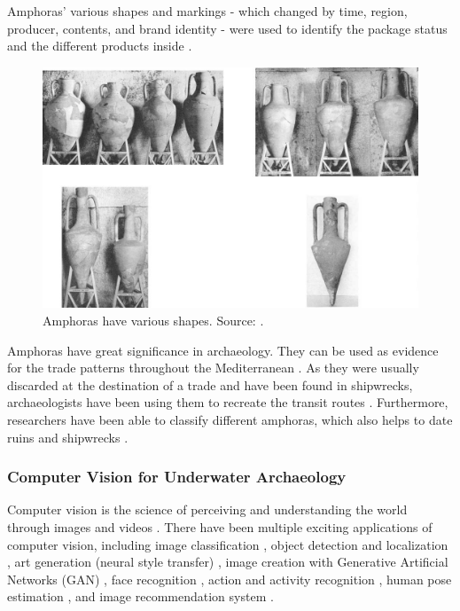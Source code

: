\documentclass[a4paper,11pt,oneside]{article}
\begin{document}
  Amphoras' various shapes and markings - which changed by time, region, producer, contents, and brand
  identity - were used to identify the package status and the different products inside \cite{twede2002commercial}.

  \begin{figure}[ht]
    \begin{center}
      \includegraphics[width=.8\textwidth]{amphora_various_shape.png}
    \end{center}
    \caption{Amphoras have various shapes. Source: \cite{twede2002commercial}.}
  \end{figure}

  Amphoras have great significance in archaeology. They can be used as evidence for the trade patterns throughout
  the Mediterranean \cite{twede2002commercial}. As they were usually discarded at the destination of a trade and have been
  found in shipwrecks, archaeologists have been using them to recreate the transit routes \cite{twede2002commercial}.
  Furthermore, researchers have been able to classify different amphoras, which also helps to date ruins and shipwrecks
  \cite{twede2002commercial}.

  \subsubsection{Computer Vision for Underwater Archaeology}

  \label{sec:112}

  Computer vision is the science of perceiving and understanding the world through images and videos \cite{elgendy2020deep}.
  There have been multiple exciting applications of computer vision, including image classification \cite{rawat2017deep},
  object detection and localization \cite{zhao2019object,liu2020deep}, art generation (neural style transfer)
  \cite{jing2019neural}, image creation with Generative Artificial Networks (GAN) \cite{goodfellow2014generative},
  face recognition \cite{parkhi2015deep}, action and activity recognition \cite{poppe2010survey}, human pose estimation
  \cite{toshev2014deeppose}, and image recommendation system \cite{niu2018neural}.
\end{document}
